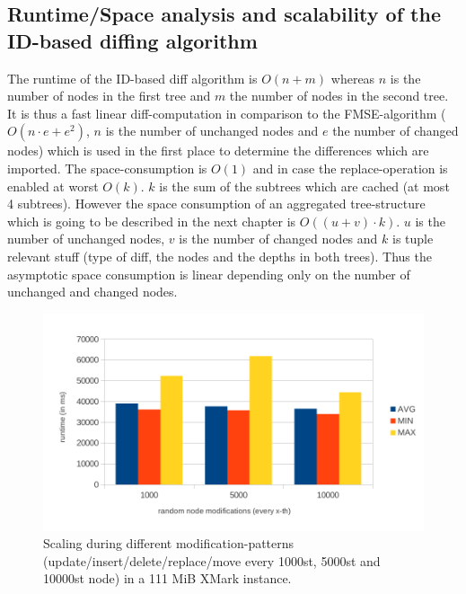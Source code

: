 \subsection{Runtime/Space analysis and scalability of the ID-based diffing algorithm}
The runtime of the ID-based diff algorithm is $O(n+m)$ whereas $n$ is the number of nodes in the first tree and $m$ the number of nodes in the second tree. It is thus a fast linear diff-computation in comparison to the FMSE-algorithm ($O(n \cdot e + e^2)$, $n$ is the number of unchanged nodes and $e$ the number of changed nodes) which is used in the first place to determine the differences which are imported. The space-consumption is $O(1)$ and in case the replace-operation is enabled at worst $O(k)$. $k$ is the sum of the subtrees which are cached (at most 4 subtrees). However the space consumption of an aggregated tree-structure which is going to be described in the next chapter is $O((u + v) \cdot k)$. $u$ is the number of unchanged nodes, $v$ is the number of changed nodes and $k$ is tuple relevant stuff (type of diff, the nodes and the depths in both trees). Thus the asymptotic space consumption is linear depending only on the number of unchanged and changed nodes.

\begin{figure}[tb]
\centering
\includegraphics[width=\textwidth]{figures/100MB-scaling}
\caption{Scaling during different modification-patterns (update/insert/delete/replace/move every 1000st, 5000st and 10000st node) in a 111 MiB XMark instance.} 
\label{fig:100MBscaling}
\end{figure}

